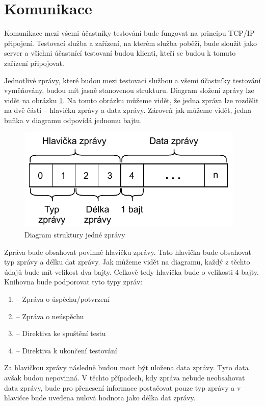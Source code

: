 \section{Komunikace}
Komunikace mezi všemi účastníky testování bude fungovat na principu TCP/IP připojení. Testovací služba a zařízení, na kterém služba poběží, bude sloužit jako server a všichni účastnící testovaní budou klienti, kteří se budou k tomuto zařízení připojovat. 

Jednotlivé zprávy, které budou mezi testovací službou a všemi účastníky testování vyměňovány, budou mít jasně stanovenou strukturu. Diagram složení zprávy lze vidět na obrázku \ref{fig:message}. Na tomto obrázku můžeme vidět, že jedna zpráva lze rozdělit na dvě části -- hlavičku zprávy a data zprávy. Zároveň jak můžeme vidět, jedna buňka v diagramu odpovídá jednomu bajtu. 

\begin{figure}[htbp]
    \centering 
    \includegraphics{assets/img/message.pdf}
    \caption{Diagram struktury jedné zprávy}
    \label{fig:message}
\end{figure}

Zpráva bude obsahovat povinně hlavičku zprávy. Tato hlavička bude obsahovat typ zprávy a délku dat zprávy. Jak můžeme vidět na diagramu, každý z těchto údajů bude mít velikost dva bajty. Celkově tedy hlavička bude o velikosti 4 bajty. Knihovna bude podporovat tyto typy zpráv:

\begin{enumerate}
    \item {} -- Zpráva o úspěchu/potvrzení
    \item {} -- Zpráva o neúspěchu
    \item {} -- Direktiva ke spuštění testu
    \item {} -- Direktiva k ukončení testování
\end{enumerate}

Za hlavičkou zprávy následně budou moct být uložena data zprávy. Tyto data avšak budou nepovinná. V těchto případech, kdy zpráva nebude neobsahovat data zprávy, bude pro přenesení informace postačovat pouze typ zprávy a v hlavičce bude uvedena nulová hodnota jako délka dat zprávy. 

